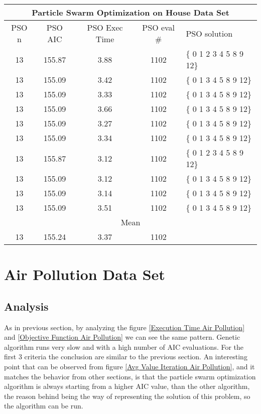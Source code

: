 \begin{tabular}{|c|c|c|c|l|}
	\hline
	\multicolumn{5}{|c|}{Particle Swarm Optimization on House Data Set}                         \\ \hline
	PSO n & PSO AIC     & PSO Exec Time & PSO eval \# & PSO solution            \\ \hline
	13    & 155.87 & 3.88              & 1102                   & \{ 0 1 2 3 4 5 8 9 12\} \\ \hline
	13    & 155.09 & 3.42              & 1102                   & \{ 0 1 3 4 5 8 9 12\}   \\ \hline
	13    & 155.09 & 3.33              & 1102                   & \{ 0 1 3 4 5 8 9 12\}   \\ \hline
	13    & 155.09 & 3.66              & 1102                   & \{ 0 1 3 4 5 8 9 12\}   \\ \hline
	13    & 155.09 & 3.27              & 1102                   & \{ 0 1 3 4 5 8 9 12\}   \\ \hline
	13    & 155.09 & 3.34              & 1102                   & \{ 0 1 3 4 5 8 9 12\}   \\ \hline
	13    & 155.87 & 3.12              & 1102                   & \{ 0 1 2 3 4 5 8 9 12\} \\ \hline
	13    & 155.09 & 3.12              & 1102                   & \{ 0 1 3 4 5 8 9 12\}   \\ \hline
	13    & 155.09 & 3.14              & 1102                   & \{ 0 1 3 4 5 8 9 12\}   \\ \hline
	13    & 155.09 & 3.51              & 1102                   & \{ 0 1 3 4 5 8 9 12\}   \\ \hline
	\multicolumn{5}{|c|}{Mean}                                                                  \\ \hline
	13    & 155.24 & 3.37             & 1102                   &                         \\ \hline
\end{tabular}

\section{Air Pollution Data Set}
\subsection{Analysis}

As in previous section, by analyzing the figure \ref{Execution Time Air Pollution} and \ref{Objective Function Air Pollution} we can see the same pattern. Genetic algorithm runs very slow and with a high number of AIC evaluations. For the first 3 criteria the conclusion are similar to the previous section. An interesting point that can be observed from figure \ref{Avg Value Iteration Air Pollution}, and it matches the behavior from other sections, is that the particle swarm optimization algorithm is always starting from a higher AIC value, than the other algorithm, the reason behind being the way of representing the solution of this problem, so the algorithm can be run.


